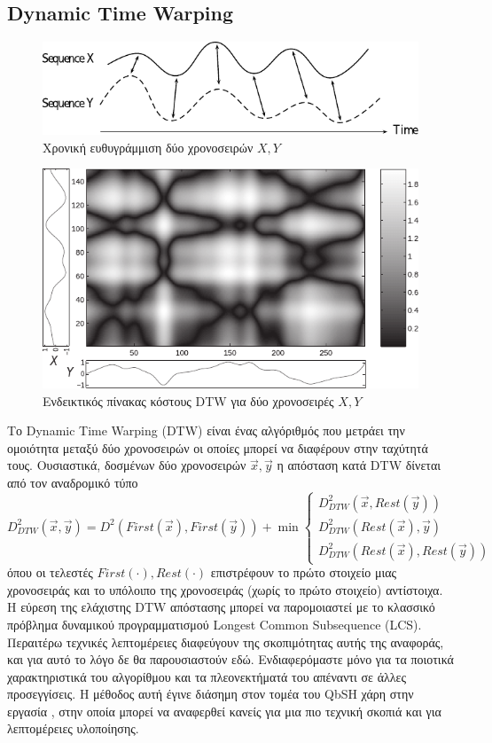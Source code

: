 \subsection{Dynamic Time Warping}
\begin{figure}[htb]
	\centering
	\includegraphics{images/dtw.pdf}
	\caption{Χρονική ευθυγράμμιση δύο χρονοσειρών $X, Y$}
\end{figure}
\begin{figure}
	\centering
	\includegraphics{images/dtw_cost.pdf}
	\caption{Ενδεικτικός πίνακας κόστους DTW για δύο χρονοσειρές $X, Y$}
\end{figure}
Το Dynamic Time Warping (DTW) είναι ένας αλγόριθμός που μετράει την ομοιότητα μεταξύ δύο χρονοσειρών οι οποίες μπορεί να διαφέρουν στην ταχύτητά τους.
Ουσιαστικά, δοσμένων δύο χρονοσειρών $\vec x, \vec y$ η απόσταση κατά DTW δίνεται από τον αναδρομικό τύπο
$$
D^2_{DTW} \left(\vec x, \vec y\right) = D^2 \left(First \left(\vec x\right), First \left(\vec y\right)\right) + \min \begin{cases} D^2_{DTW} \left(\vec x, Rest \left(\vec y\right)\right) \\
 D^2_{DTW} \left(Rest \left(\vec x\right),\vec y\right) \\
 D^2_{DTW} \left(Rest \left(\vec x\right), Rest \left(\vec y\right)\right) \end{cases}
$$
όπου οι τελεστές $First \left( \cdot\right), Rest \left( \cdot\right)$ επιστρέφουν το πρώτο στοιχείο μιας χρονοσειράς και το υπόλοιπο της χρονοσειράς (χωρίς το πρώτο στοιχείο) αντίστοιχα. 
Η εύρεση της ελάχιστης DTW απόστασης μπορεί να παρομοιαστεί με το κλασσικό πρόβλημα δυναμικού προγραμματισμού Longest Common Subsequence (LCS).
Περαιτέρω τεχνικές λεπτομέρειες διαφεύγουν της σκοπιμότητας αυτής της αναφοράς, και για αυτό το λόγο δε θα παρουσιαστούν εδώ.
Ενδιαφερόμαστε μόνο για τα ποιοτικά χαρακτηριστικά του αλγορίθμου και τα πλεονεκτήματά του απέναντι σε άλλες προσεγγίσεις.
Η μέθοδος αυτή έγινε διάσημη στον τομέα του QbSH χάρη στην εργασία \cite{Zhu:2003:WIE:872757.872780}, στην  οποία μπορεί να αναφερθεί κανείς για μια πιο τεχνική σκοπιά και για λεπτομέρειες υλοποίησης.

